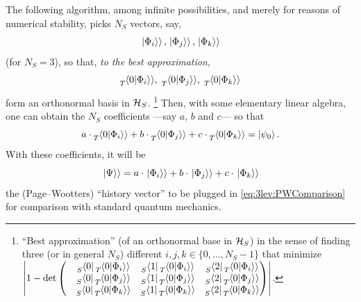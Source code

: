 The following algorithm, among infinite possibilities,
and merely for reasons of numerical stability,
picks $N_S$
vectors, say,
\[
  \left.\left| \Phi_i \right\rangle\right\rangle, \left.\left| \Phi_j \right\rangle\right\rangle, \left.\left| \Phi_k \right\rangle\right\rangle
\]
(for $N_S = 3$),
so that, \emph{to the best approximation},
\[
  \prescript{}{T}{\!\left.\left\langle 0 \middle| \Phi_i \right\rangle\right\rangle}, \;
  \prescript{}{T}{\!\left.\left\langle 0 \middle| \Phi_j \right\rangle\right\rangle}, \;
  \prescript{}{T}{\!\left.\left\langle 0 \middle| \Phi_k \right\rangle\right\rangle}
\]
form an orthonormal basis in $\mathcal{H}_S$.%
\footnote{
  ``Best approximation'' (of an orthonormal base in $\mathcal{H}_S$)
  in the sense of finding
  three (or in general $N_S$) different
  $i, j, k \in \{0, \dots, N_{S}-1\}$ that minimize
  $
    \abs{1 - \det\mqty(
      & \prescript{}{S}{\bra{0}}   \prescript{}{T}{\bradket{0}{\Phi_i}}
      & \prescript{}{S}{\bra{1}}   \prescript{}{T}{\bradket{0}{\Phi_i}}
      & \prescript{}{S}{\bra{2}}   \prescript{}{T}{\bradket{0}{\Phi_i}}
      \\
      & \prescript{}{S}{\bra{0}}   \prescript{}{T}{\bradket{0}{\Phi_j}}
      & \prescript{}{S}{\bra{1}}   \prescript{}{T}{\bradket{0}{\Phi_j}}
      & \prescript{}{S}{\bra{2}}   \prescript{}{T}{\bradket{0}{\Phi_j}}
      \\
      & \prescript{}{S}{\bra{0}}   \prescript{}{T}{\bradket{0}{\Phi_k}}
      & \prescript{}{S}{\bra{1}}   \prescript{}{T}{\bradket{0}{\Phi_k}}
      & \prescript{}{S}{\bra{2}}   \prescript{}{T}{\bradket{0}{\Phi_k}}
    )}
  $.
}
Then, with some elementary linear algebra, one can obtain the $N_S$
coefficients
---say $a$, $b$ and $c$---
so that \begin{equation}\label{eq:3lev:initialLinEq}
  a\cdot\prescript{}{T}{\!\left.\left\langle 0 \middle| \Phi_i \right\rangle\right\rangle} +
  b\cdot\prescript{}{T}{\!\left.\left\langle 0 \middle| \Phi_j \right\rangle\right\rangle} +
  c\cdot\prescript{}{T}{\!\left.\left\langle 0 \middle| \Phi_k \right\rangle\right\rangle} =
  \ket{\psi_0} .
\end{equation}
With these coefficients, it will be
\begin{equation}\label{eq:3lev:PhiLinearComb}
  \left.\left| \Psi \right\rangle\right\rangle =
  a\cdot\left.\left| \Phi_i \right\rangle\right\rangle +
  b\cdot\left.\left| \Phi_j \right\rangle\right\rangle +
  c\cdot\left.\left| \Phi_k \right\rangle\right\rangle
\end{equation}
the (Page--Wootters) ``history vector'' to be plugged in \eqref{eq:3lev:PWComparison}
for comparison with standard quantum mechanics.


